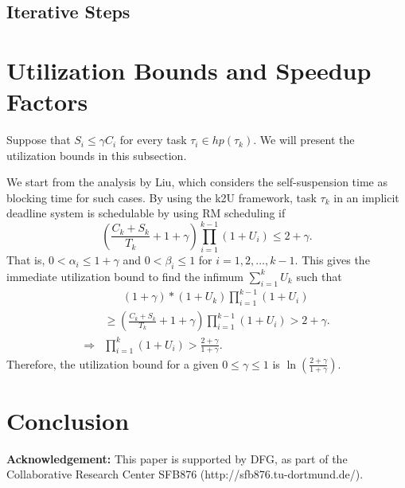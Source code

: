 \documentclass[10pt,conference,preprint]{IEEEtran}
\def\myendproof{{\ \vbox{\hrule\hbox{%
   \vrule height1.3ex\hskip0.8ex\vrule}\hrule }}\par}
\renewenvironment{proof}{\noindent{\bf Proof. }}{\myendproof}
\newtheorem{Corollary}{Corollary}
\begin{document}
  

\subsection{Iterative Steps}

\section{Utilization Bounds and Speedup Factors}
Suppose that $S_i \leq \gamma C_i$ for every task $\tau_i \in hp(\tau_k)$. We will present the utilization bounds in this subsection. 

We start from the analysis by Liu, which considers the self-suspension time as blocking time for such cases.
By using the k2U framework, task $\tau_k$ in an implicit deadline system is schedulable by using RM scheduling if
\[
(\frac{C_k + S_k}{ T_k}+1+\gamma) \prod_{i=1}^{k-1}(1+U_i) \leq 2+\gamma.
\]
That is, $0 < \alpha_i \leq  1+\gamma$ and $0 < \beta_i \leq 1$ for $i=1,2,\ldots,k-1$.
This gives the immediate utilization bound to find the infimum $\sum_{i=1}^{k} U_k$ such that
\begin{align*}
&\;\;\;\;\;\; (1+\gamma)*(1+U_k) \prod_{i=1}^{k-1}(1+U_i) \\
&\geq (\frac{C_k + S_k}{ T_k}+1+\gamma) \prod_{i=1}^{k-1}(1+U_i) > 2+\gamma.\\
\Rightarrow & \prod_{i=1}^{k}(1+U_i) > \frac{2+\gamma}{1+\gamma}.
\end{align*}
Therefore, the utilization bound for a given $0 \leq \gamma \leq 1$  is $\ln(\frac{2+\gamma}{1+\gamma})$.


\section{Conclusion}
\label{sec:conclusion}


{\bf Acknowledgement:} This paper is supported by DFG, as part of the Collaborative Research Center SFB876 (http://sfb876.tu-dortmund.de/).

{}
\end{document}
